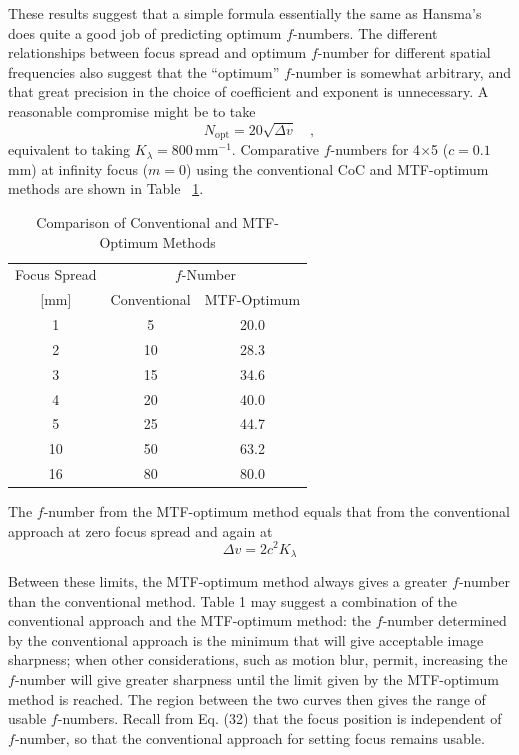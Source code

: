 \documentclass[11pt, oneside]{scrartcl}   	%
\newcommand{\Dv}{\ensuremath{\Delta v}}
\begin{document}
These results suggest that a simple formula essentially the same as Hansma’s does quite a good job of predicting optimum $f$-numbers. The different relationships between focus spread and optimum $f$-number for different spatial frequencies also suggest that the “optimum” $f$-number is somewhat arbitrary, and that great precision in the choice of coefficient and exponent is unnecessary. A reasonable compromise might be to take
\begin{equation}
   N_\mathrm{opt} = 20 \sqrt{\Dv}\quad, 
   \label{eq:Nopt}
\end{equation}
equivalent to taking $K_\lambda = 800\,\mathrm{mm}^{-1}$. Comparative $f$-numbers for 4$\times$5 ($c = 0.1$\,mm) at infinity focus  ($m = 0$) using the conventional CoC and MTF-optimum methods are shown in Table ~\ref{tab:opt}. 
 \begin{table}[htp]
\caption{Comparison of Conventional and MTF-Optimum Methods}
\begin{center}
\begin{tabular}{|c|c|c|}
\hline
Focus Spread & \multicolumn{2}{c|}{$f$-Number}\\
\cline{2-3}
[mm] & Conventional & MTF-Optimum\\
\hline
\hphantom{0}1 & \hphantom{0}5 & 20.0 \\
\hphantom{0}2 & 10 & 28.3 \\
\hphantom{0}3 &15 & 34.6 \\
\hphantom{0}4 &20 & 40.0 \\
\hphantom{0}5 &25 & 44.7 \\
10 &50 & 63.2 \\
16 & 80 & 80.0 \\
\hline
\end{tabular}
\end{center}
\label{tab:opt}
\end{table}

The $f$-number from the MTF-optimum method equals that from the conventional approach at zero focus spread and again at
\begin{equation}
  \Dv = 2c^2K_\lambda
  \label{eq:DvMTF}
\end{equation}

Between these limits, the MTF-optimum method always gives a greater $f$-number than the conventional method. Table 1 may suggest a combination of the conventional approach and the MTF-optimum method: the $f$-number determined by the conventional approach is the minimum that will give acceptable image sharpness; when other considerations, such as motion blur, permit, increasing the $f$-number will give greater sharpness until the limit given by the MTF-optimum method is reached. The region between the two curves then gives the range of usable $f$-numbers. Recall from Eq. (32) that the focus position is independent of $f$-number, so that the conventional approach for setting focus remains usable.
\end{document}
